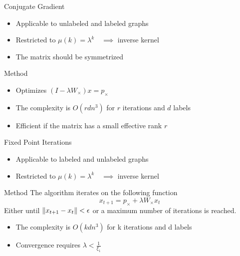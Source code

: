 \documentclass[compress]{beamer}
\DeclarePairedDelimiter{\norm}{\lVert}{\rVert}
\begin{document}
\begin{frame}{Conjugate Gradient}
	\begin{itemize}
		\item Applicable to unlabeled and labeled graphs
		\item Restricted to $\mu(k)=\lambda^k\quad\implies$ inverse kernel
		\item The matrix should be symmetrized
	\end{itemize}
	\begin{block}{Method}
		\begin{itemize}
			\item Optimizes $(I-\lambda W_\times)x=p_\times$
		\end{itemize}
	\end{block}
\begin{itemize}
	\item The complexity is $O(rdn^3)$ for $r$ iterations and $d$ labels
	\item Efficient if the matrix has a small effective rank $r$
\end{itemize}
\end{frame}
\begin{frame}{Fixed Point Iterations}
\begin{itemize}
	\item Applicable to labeled and unlabeled graphs
	\item Restricted to $\mu(k)=\lambda^k\quad\implies$ inverse kernel
\end{itemize}
\begin{block}{Method}
The algorithm iterates on the following function
\begin{equation*}
x_{t+1} = p_\times + \lambda W_{\times}x_t
\end{equation*}
Either until $\norm{x_{t+1}-x_t}<\epsilon$ or a maximum number of iterations is reached.
\end{block}
\begin{itemize}
	\item The complexity is $O(kdn^3)$ for k iterations and d labels
	\item Convergence requires $\lambda < \frac{1}{\xi_1}$
\end{itemize}
\end{frame}
\end{document}
